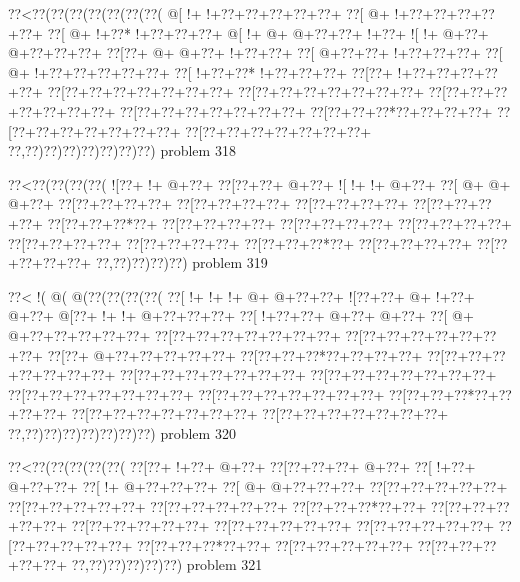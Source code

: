 \vbox{\vbox{\goo
\0??<\0??(\0??(\0??(\0??(\0??(\0??(\0??(
\- @[\- !+\- !+\0??+\0??+\0??+\0??+\0??+
\0??[\- @+\- !+\0??+\0??+\0??+\0??+\0??+
\0??[\- @+\- !+\0??*\- !+\0??+\0??+\0??+
\- @[\- !+\- @+\- @+\0??+\0??+\- !+\0??+
\- ![\- !+\- @+\0??+\- @+\0??+\0??+\0??+
\0??[\0??+\- @+\- @+\0??+\- !+\0??+\0??+
\0??[\- @+\0??+\0??+\- !+\0??+\0??+\0??+
\0??[\- @+\- !+\0??+\0??+\0??+\0??+\0??+
\0??[\- !+\0??+\0??*\- !+\0??+\0??+\0??+
\0??[\0??+\- !+\0??+\0??+\0??+\0??+\0??+
\0??[\0??+\0??+\0??+\0??+\0??+\0??+\0??+
\0??[\0??+\0??+\0??+\0??+\0??+\0??+\0??+
\0??[\0??+\0??+\0??+\0??+\0??+\0??+\0??+
\0??[\0??+\0??+\0??+\0??+\0??+\0??+\0??+
\0??[\0??+\0??+\0??*\0??+\0??+\0??+\0??+
\0??[\0??+\0??+\0??+\0??+\0??+\0??+\0??+
\0??[\0??+\0??+\0??+\0??+\0??+\0??+\0??+
\0??,\0??)\0??)\0??)\0??)\0??)\0??)\0??)
}
\hfil problem 318\hfil\break
}

\vbox{\vbox{\goo
\0??<\0??(\0??(\0??(\0??(
\- ![\0??+\- !+\- @+\0??+
\0??[\0??+\0??+\- @+\0??+
\- ![\- !+\- !+\- @+\0??+
\0??[\- @+\- @+\- @+\0??+
\0??[\0??+\0??+\0??+\0??+
\0??[\0??+\0??+\0??+\0??+
\0??[\0??+\0??+\0??+\0??+
\0??[\0??+\0??+\0??+\0??+
\0??[\0??+\0??+\0??*\0??+
\0??[\0??+\0??+\0??+\0??+
\0??[\0??+\0??+\0??+\0??+
\0??[\0??+\0??+\0??+\0??+
\0??[\0??+\0??+\0??+\0??+
\0??[\0??+\0??+\0??+\0??+
\0??[\0??+\0??+\0??*\0??+
\0??[\0??+\0??+\0??+\0??+
\0??[\0??+\0??+\0??+\0??+
\0??,\0??)\0??)\0??)\0??)
}
\hfil problem 319\hfil\break
}

\vbox{\vbox{\goo
\0??<\- !(\- @(\- @(\0??(\0??(\0??(\0??(
\0??[\- !+\- !+\- !+\- @+\- @+\0??+\0??+
\- ![\0??+\0??+\- @+\- !+\0??+\- @+\0??+
\- @[\0??+\- !+\- !+\- @+\0??+\0??+\0??+
\0??[\- !+\0??+\0??+\- @+\0??+\- @+\0??+
\0??[\- @+\- @+\0??+\0??+\0??+\0??+\0??+
\0??[\0??+\0??+\0??+\0??+\0??+\0??+\0??+
\0??[\0??+\0??+\0??+\0??+\0??+\0??+\0??+
\0??[\0??+\- @+\0??+\0??+\0??+\0??+\0??+
\0??[\0??+\0??+\0??*\0??+\0??+\0??+\0??+
\0??[\0??+\0??+\0??+\0??+\0??+\0??+\0??+
\0??[\0??+\0??+\0??+\0??+\0??+\0??+\0??+
\0??[\0??+\0??+\0??+\0??+\0??+\0??+\0??+
\0??[\0??+\0??+\0??+\0??+\0??+\0??+\0??+
\0??[\0??+\0??+\0??+\0??+\0??+\0??+\0??+
\0??[\0??+\0??+\0??*\0??+\0??+\0??+\0??+
\0??[\0??+\0??+\0??+\0??+\0??+\0??+\0??+
\0??[\0??+\0??+\0??+\0??+\0??+\0??+\0??+
\0??,\0??)\0??)\0??)\0??)\0??)\0??)\0??)
}
\hfil problem 320\hfil\break
}

\vbox{\vbox{\goo
\0??<\0??(\0??(\0??(\0??(\0??(
\0??[\0??+\- !+\0??+\- @+\0??+
\0??[\0??+\0??+\0??+\- @+\0??+
\0??[\- !+\0??+\- @+\0??+\0??+
\0??[\- !+\- @+\0??+\0??+\0??+
\0??[\- @+\- @+\0??+\0??+\0??+
\0??[\0??+\0??+\0??+\0??+\0??+
\0??[\0??+\0??+\0??+\0??+\0??+
\0??[\0??+\0??+\0??+\0??+\0??+
\0??[\0??+\0??+\0??*\0??+\0??+
\0??[\0??+\0??+\0??+\0??+\0??+
\0??[\0??+\0??+\0??+\0??+\0??+
\0??[\0??+\0??+\0??+\0??+\0??+
\0??[\0??+\0??+\0??+\0??+\0??+
\0??[\0??+\0??+\0??+\0??+\0??+
\0??[\0??+\0??+\0??*\0??+\0??+
\0??[\0??+\0??+\0??+\0??+\0??+
\0??[\0??+\0??+\0??+\0??+\0??+
\0??,\0??)\0??)\0??)\0??)\0??)
}
\hfil problem 321\hfil\break
}

